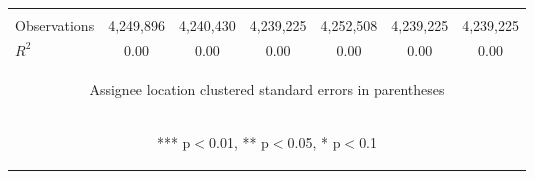 \begin{center}
\begin{tabular}{lcccccc}
\vspace{4pt} & \begin{footnotesize}\end{footnotesize} & \begin{footnotesize}\end{footnotesize} & \begin{footnotesize}\end{footnotesize} & \begin{footnotesize}\end{footnotesize} & \begin{footnotesize}\end{footnotesize} & \begin{footnotesize}\end{footnotesize} \\
Observations & 4,249,896 & 4,240,430 & 4,239,225 & 4,252,508 & 4,239,225 & 4,239,225 \\
 $R^2$ & 0.00 & 0.00 & 0.00 & 0.00 & 0.00 & 0.00 \\ \hline
\multicolumn{7}{c}{\begin{footnotesize} Assignee location clustered standard errors in parentheses\end{footnotesize}} \\
\multicolumn{7}{c}{\begin{footnotesize} *** p$<$0.01, ** p$<$0.05, * p$<$0.1\end{footnotesize}} \\
\end{tabular}
\end{center}
